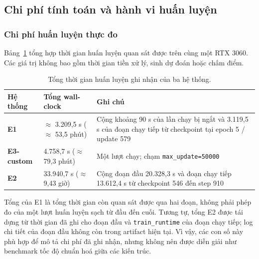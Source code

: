 
\subsection{Chi phí tính toán và hành vi huấn luyện}

\subsubsection{Chi phí huấn luyện thực đo}

Bảng~\ref{tab:wallclock} tổng hợp thời gian huấn luyện quan sát được trên cùng
một RTX 3060. Các giá trị không bao gồm thời gian tiền xử lý, sinh dự đoán hoặc
chấm điểm.

\begin{table}[tbp]
  \centering
  \small
  \renewcommand{\arraystretch}{1.18}
  \caption{Tổng thời gian huấn luyện ghi nhận của ba hệ thống.}
  \label{tab:wallclock}
  \begin{tabularx}{\textwidth}{@{}>{\bfseries}p{3.4cm}p{3.1cm}X@{}}
    \toprule
    Hệ thống & Tổng wall-clock & Ghi chú \\
    \midrule
    E1
      & $\approx$ 3.209,5 s ($\approx$ 53,5 phút)
      & Cộng khoảng 90 s của lần chạy bị ngắt và 3.119,5 s của đoạn chạy tiếp
        từ checkpoint tại epoch 5 / update 579 \\
    E3-custom
      & 4.758,7 s ($\approx$ 79,3 phút)
      & Một lượt chạy; chạm \texttt{max\_update=50000} \\
    E2
      & 33.940,7 s ($\approx$ 9,43 giờ)
      & Cộng đoạn đầu 20.328,3 s và đoạn chạy tiếp 13.612,4 s từ checkpoint
        546 đến step 910 \\
    \bottomrule
  \end{tabularx}
\end{table}

Tổng của E1 là tổng thời gian còn quan sát được qua hai đoạn, không phải phép đo
của một lượt huấn luyện sạch từ đầu đến cuối. Tương tự, tổng E2 được tái dựng
từ thời gian đã ghi cho đoạn đầu và \texttt{train\_runtime} của đoạn chạy tiếp;
log chi tiết của đoạn đầu không còn trong artifact hiện tại. Vì vậy, các con số
này phù hợp để mô tả chi phí đã ghi nhận, nhưng không nên được diễn giải như
benchmark tốc độ chuẩn hoá giữa các kiến trúc.

